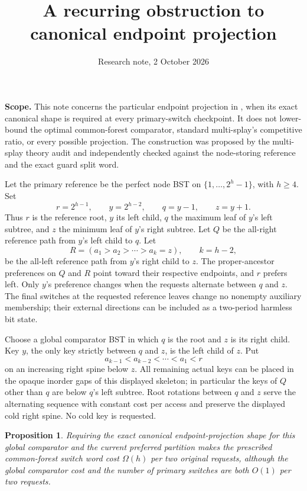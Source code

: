 \documentclass[11pt]{article}
\title{A recurring obstruction to canonical endpoint projection}
\author{Research note, 2 October 2026}
\date{}
\newtheorem{proposition}{Proposition}
\begin{document}
\maketitle

\noindent\textbf{Scope.}
This note concerns the particular endpoint projection in
, when its exact canonical shape is
required at every primary-switch checkpoint. It does not lower-bound
the optimal common-forest comparator, standard multi-splay's competitive
ratio, or every possible projection. The construction was proposed by
the multi-splay theory audit and independently checked against the
node-storing reference and the exact guard split word.

Let the primary reference be the perfect node BST on
$\{1,\ldots,2^h-1\}$, with $h\ge4$. Set
\[
 r=2^{h-1},\qquad y=2^{h-2},\qquad
 q=y-1,\qquad z=y+1.
\]
Thus $r$ is the reference root, $y$ its left child, $q$ the maximum
leaf of $y$'s left subtree, and $z$ the minimum leaf of $y$'s right
subtree. Let $Q$ be the all-right reference path from $y$'s left child
to $q$. Let
\[
 R=(a_1>a_2>\cdots>a_k=z),\qquad k=h-2,
\]
be the all-left reference path from $y$'s right child to $z$.
The proper-ancestor preferences on $Q$ and $R$ point toward their
respective endpoints, and $r$ prefers left. Only $y$'s preference
changes when the requests alternate between $q$ and $z$.
The final switches at the requested reference leaves change no
nonempty auxiliary membership; their external directions can be
included as a two-period harmless bit state.

Choose a global comparator BST in which $q$ is the root and $z$ is
its right child. Key $y$, the only key strictly between $q$ and $z$,
is the left child of $z$. Put
\[
 a_{k-1}<a_{k-2}<\cdots<a_1<r
\]
on an increasing right spine below $z$. All remaining actual keys
can be placed in the opaque inorder gaps of this displayed skeleton;
in particular the keys of $Q$ other than $q$ are below $q$'s left
subtree. Root rotations between $q$ and $z$ serve the alternating
sequence with constant cost per access and preserve the displayed
cold right spine. No cold key is requested.

\begin{proposition}
Requiring the exact canonical endpoint-projection shape for this
global comparator and the current preferred partition makes the
prescribed common-forest switch word cost $\Omega(h)$ per two original
requests, although the global comparator cost and the number of
primary switches are both $O(1)$ per two requests.
\end{proposition}
\end{document}
